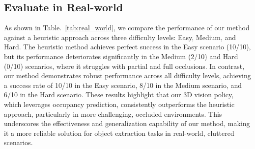 \subsection{Evaluate in Real-world}
As shown in Table.~\ref{tab:real_world}, we compare the performance of our method against a heuristic approach across three difficulty levels: Easy, Medium, and Hard. The heuristic method achieves perfect success in the Easy scenario (10/10), but its performance deteriorates significantly in the Medium (2/10) and Hard (0/10) scenarios, where it struggles with partial and full occlusions. In contrast, our method demonstrates robust performance across all difficulty levels, achieving a success rate of 10/10 in the Easy scenario, 8/10 in the Medium scenario, and 6/10 in the Hard scenario. These results highlight that our 3D vision policy, which leverages occupancy prediction, consistently outperforms the heuristic approach, particularly in more challenging, occluded environments. This underscores the effectiveness and generalization capability of our method, making it a more reliable solution for object extraction tasks in real-world, cluttered scenarios.





